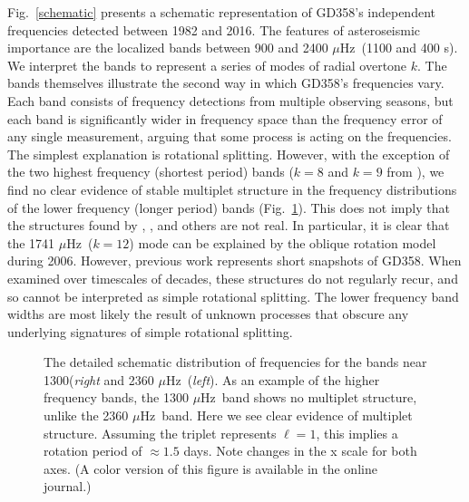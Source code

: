 \documentclass[12pt,preprint]{aastex}
\newcommand{\muHz}{\mbox{$\mu$Hz}}
\begin{document}
Fig.~\ref{schematic} presents a schematic representation of GD358's 
independent frequencies detected between 1982 and 2016.  
The features of asteroseismic importance are the localized bands between 900 and 2400
\muHz\ (1100 and 400 s). We interpret the bands to represent a series of modes of radial overtone $k$. The bands
themselves illustrate the second way in which GD358's frequencies vary. Each band consists of 
frequency detections from multiple observing seasons, but each band is significantly wider in 
frequency space than the frequency error of any single measurement, arguing that some process 
is acting on the frequencies. The simplest explanation is rotational splitting.  However, with the 
exception of the two highest frequency (shortest period) bands ($k=8$ and $k=9$ 
from \citet{Provencal09}), we find no clear evidence of stable multiplet structure in the frequency 
distributions of the lower frequency (longer period) bands (Fig.~\ref{rot}). This does not imply that the 
structures found by \cite{Winget94}, \cite{Kepler03}, \cite{Montgomery10} and others are not real. In 
particular, it is clear that the 1741 \muHz\ ($k=12$) mode can be explained by the oblique rotation model during 2006. However, 
previous work represents short snapshots of GD358. When examined over timescales of decades, these structures 
do not regularly recur, and so cannot be interpreted as simple rotational splitting. The lower frequency band widths 
are most likely the result of unknown processes that obscure any 
underlying signatures of simple rotational splitting. 
\begin{figure}
 \caption{The detailed schematic distribution of frequencies for the bands near 1300({\em{right}}
 and 2360 \muHz\ ({\em{left}}). As an example of the higher frequency bands, the 1300 \muHz\ band 
 shows no multiplet structure, unlike the 2360 \muHz\ band. Here we see clear evidence of multiplet 
 structure. Assuming the triplet represents
 $\ell=1$, this implies a rotation period of $\approx 1.5$ days. Note changes in the x scale for both axes.
 (A color version of this figure is available in the online journal.)
 \label{rot}}
\end{figure}
\end{document}
